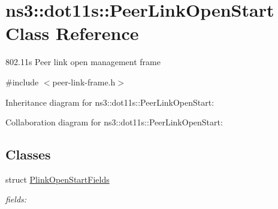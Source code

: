\hypertarget{classns3_1_1dot11s_1_1PeerLinkOpenStart}{}\section{ns3\+:\+:dot11s\+:\+:Peer\+Link\+Open\+Start Class Reference}
\label{classns3_1_1dot11s_1_1PeerLinkOpenStart}


802.\+11s Peer link open management frame  




{\ttfamily \#include $<$peer-\/link-\/frame.\+h$>$}



Inheritance diagram for ns3\+:\+:dot11s\+:\+:Peer\+Link\+Open\+Start\+:


Collaboration diagram for ns3\+:\+:dot11s\+:\+:Peer\+Link\+Open\+Start\+:
\subsection*{Classes}
\begin{DoxyCompactItemize}
\item 
struct \hyperlink{structns3_1_1dot11s_1_1PeerLinkOpenStart_1_1PlinkOpenStartFields}{Plink\+Open\+Start\+Fields}
\begin{DoxyCompactList}\small\item\em fields\+: \end{DoxyCompactList}\end{DoxyCompactItemize}
